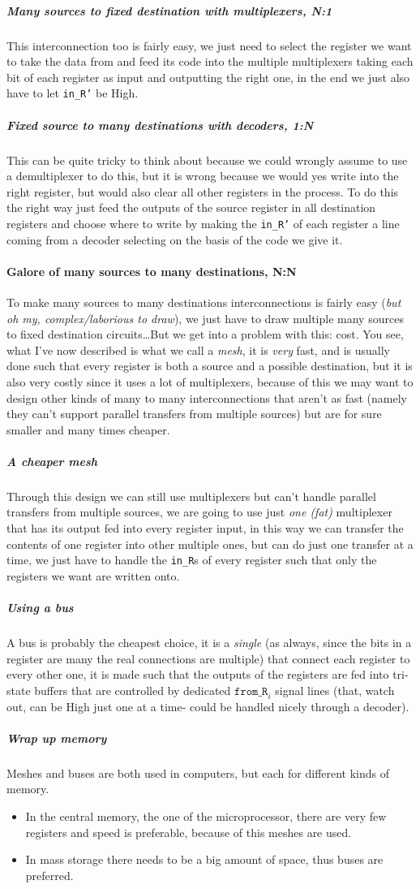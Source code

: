 \documentclass{scrartcl}
\begin{document}
    \subparagraph{Many sources to fixed destination with multiplexers, N:1} This interconnection too is fairly easy, we just need to select the register we want to take the data from and feed its code into the multiple multiplexers taking each bit of each register as input and outputting the right one, in the end we just also have to let \texttt{in\_R'} be High.
    \subparagraph{Fixed source to many destinations with decoders, 1:N} This can be quite tricky to think about because we could wrongly assume to use a demultiplexer to do this, but it is wrong because we would yes write into the right register, but would also clear all other registers in the process. To do this the right way just feed the outputs of the source register in all destination registers and choose where to write by making the \texttt{in\_R'} of each register a line coming from a decoder selecting on the basis of the code we give it.
    \paragraph{Galore of many sources to many destinations, N:N} To make many sources to many destinations interconnections is fairly easy (\emph{but oh my, complex/laborious to draw}), we just have to draw multiple many sources to fixed destination circuits\dots But we get into a problem with this: cost. You see, what I've now described is what we call a \emph{mesh}, it is \emph{very} fast, and is usually done such that every register is both a source and a possible destination, but it is also very costly since it uses a lot of multiplexers, because of this we may want to design other kinds of many to many interconnections that aren't as fast (namely they can't support parallel transfers from multiple sources) but are for sure smaller and many times cheaper.
    \subparagraph{A cheaper mesh} Through this design we can still use multiplexers but can't handle parallel transfers from multiple sources, we are going to use just \emph{one (fat)} multiplexer that has its output fed into every register input, in this way we can transfer the contents of one register into other multiple ones, but can do just one transfer at a time, we just have to handle the \texttt{in\_R}s of every register such that only the registers we want are written onto.
    \subparagraph{Using a bus} A bus is probably the cheapest choice, it is a \emph{single} (as always, since the bits in a register are many the real connections are multiple) that connect each register to every other one, it is made such that the outputs of the registers are fed into tri-state buffers that are controlled by dedicated $\texttt{from\_R}_{i}$ signal lines (that, watch out, can be High just one at a time- could be handled nicely through a decoder).
    \subparagraph{Wrap up memory} Meshes and buses are both used in computers, but each for different kinds of memory.
    \begin{itemize}
        \item In the central memory, the one of the microprocessor, there are very few registers and speed is preferable, because of this meshes are used.
        \item In mass storage there needs to be a big amount of space, thus buses are preferred.
    \end{itemize}
\end{document}
